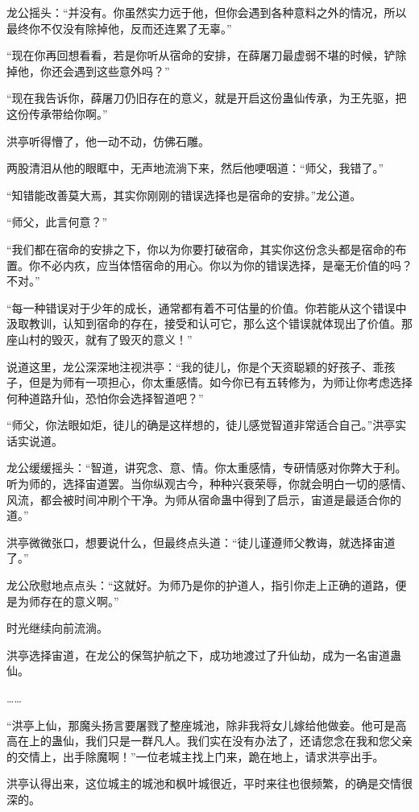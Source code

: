 \begin{this_body}
龙公摇头：“并没有。你虽然实力远于他，但你会遇到各种意料之外的情况，所以最终你不仅没有除掉他，反而还连累了无辜。”

“现在你再回想看看，若是你听从宿命的安排，在薛屠刀最虚弱不堪的时候，铲除掉他，你还会遇到这些意外吗？”

“现在我告诉你，薛屠刀仍旧存在的意义，就是开启这份蛊仙传承，为王先驱，把这份传承带给你啊。”

洪亭听得懵了，他一动不动，仿佛石雕。

两股清泪从他的眼眶中，无声地流淌下来，然后他哽咽道：“师父，我错了。”

“知错能改善莫大焉，其实你刚刚的错误选择也是宿命的安排。”龙公道。

“师父，此言何意？”

“我们都在宿命的安排之下，你以为你要打破宿命，其实你这份念头都是宿命的布置。你不必内疚，应当体悟宿命的用心。你以为你的错误选择，是毫无价值的吗？不对。”

“每一种错误对于少年的成长，通常都有着不可估量的价值。你若能从这个错误中汲取教训，认知到宿命的存在，接受和认可它，那么这个错误就体现出了价值。那座山村的毁灭，就有了毁灭的意义！”

说道这里，龙公深深地注视洪亭：“我的徒儿，你是个天资聪颖的好孩子、乖孩子，但是为师有一项担心，你太重感情。如今你已有五转修为，为师让你考虑选择何种道路升仙，恐怕你会选择智道吧？”

“师父，你法眼如炬，徒儿的确是这样想的，徒儿感觉智道非常适合自己。”洪亭实话实说道。

龙公缓缓摇头：“智道，讲究念、意、情。你太重感情，专研情感对你弊大于利。听为师的，选择宙道罢。当你纵观古今，种种兴衰荣辱，你就会明白一切的感情、风流，都会被时间冲刷个干净。为师从宿命蛊中得到了启示，宙道是最适合你的道。”

洪亭微微张口，想要说什么，但最终点头道：“徒儿谨遵师父教诲，就选择宙道了。”

龙公欣慰地点点头：“这就好。为师乃是你的护道人，指引你走上正确的道路，便是为师存在的意义啊。”

时光继续向前流淌。

洪亭选择宙道，在龙公的保驾护航之下，成功地渡过了升仙劫，成为一名宙道蛊仙。

……

“洪亭上仙，那魔头扬言要屠戮了整座城池，除非我将女儿嫁给他做妾。他可是高高在上的蛊仙，我们只是一群凡人。我们实在没有办法了，还请您念在我和您父亲的交情上，出手除魔啊！”一位老城主找上门来，跪在地上，请求洪亭出手。

洪亭认得出来，这位城主的城池和枫叶城很近，平时来往也很频繁，的确是交情很深的。


\end{this_body}
